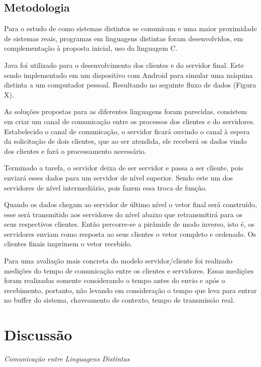 \documentclass[12pt,a4paper]{article}
\begin{document}
\subsection{Metodologia}
Para o estudo de como sistemas distintos se comunicam e uma maior proximidade de sistemas reais, programas em linguagens distintas foram desenvolvidos, em complementação à proposta inicial, uso da linguagem C.

Java foi utilizado para o desenvolvimento dos clientes e do servidor final. Este sendo implementado em um dispositivo com Android para simular uma máquina distinta a um computador pessoal. Resultando no seguinte fluxo de dados (Figura X).

As soluções propostas para as diferentes linguagens foram parecidas, consistem em criar um canal de comunicação entre os processos dos clientes e do servidores. Estabelecido o canal de comunicação, o servidor ficará ouvindo o canal à espera da solicitação de dois clientes, que ao ser atendida, ele receberá os dados vindo dos clientes e fará o processamento necessário.

Terminado a tarefa, o servidor deixa de ser servidor e passa a ser cliente, pois enviará esses dados para um servidor de nível superior. Sendo este um dos servidores de nível intermediário, pois fazem essa troca de função.

Quando os dados chegam ao servidor de último nível o vetor final será construído, esse será transmitido aos servidores do nível abaixo que retransmitirá para os seus respectivos clientes. Então percorre-se a pirâmide de modo inverso, isto é, os servidores enviam como resposta ao seus clientes o vetor completo e ordenado. Os clientes finais imprimem o vetor recebido.

Para uma avaliação mais concreta do modelo servidor/cliente foi realizado medições do tempo de comunicação entre os clientes e servidores. Essas medições foram realizadas somente considerando o tempo antes do envio e após o recebimento, portanto, não levando em consideração o tempo que leva para entrar no buffer do sistema, chaveamento de contexto, tempo de transmissão real. 


\newpage
\section{Discussão}
\textit{\Large{Comunicação entre Linguagens Distintas}}
\\
\end{document}
